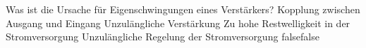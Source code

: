     {Was ist die Ursache für Eigenschwingungen eines Verstärkers?}
    {Kopplung zwischen Ausgang und Eingang}
    {Unzulängliche Verstärkung}
    {Zu hohe Restwelligkeit in der Stromversorgung}
    {Unzulängliche Regelung der Stromversorgung}
    {false}{false}